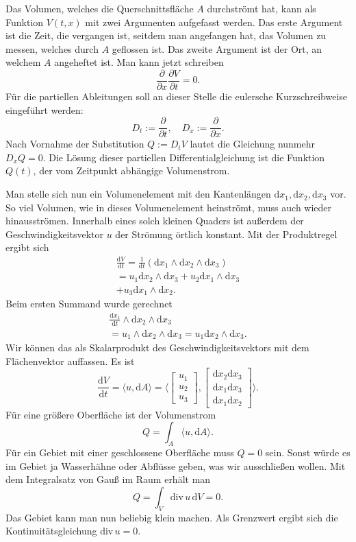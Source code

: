 \documentclass[a4paper,10pt,fleqn,twocolumn,twoside]{scrartcl}
\begin{document}
Das Volumen, welches die Querschnittsfläche $A$ durchströmt hat,
kann als Funktion $V(t,x)$ mit zwei Argumenten aufgefasst werden.
Das erste Argument ist die Zeit, die vergangen ist,
seitdem man angefangen hat, das Volumen zu messen, welches durch
$A$ geflossen ist. Das zweite Argument ist der Ort, an welchem
$A$ angeheftet ist. Man kann jetzt schreiben%
\[\frac{\partial}{\partial x}\frac{\partial V}{\partial t}=0.\]
Für die partiellen Ableitungen soll an dieser Stelle die eulersche
Kurzschreibweise eingeführt werden:%
\[D_t := \frac{\partial}{\partial t},\quad
D_x := \frac{\partial}{\partial x}.\]
Nach Vornahme der Substitution $Q:=D_tV$ lautet die
Gleichung nunmehr $D_x Q=0$. Die Lösung dieser partiellen
Differentialgleichung ist die Funktion $Q(t)$, der vom
Zeitpunkt abhängige Volumenstrom.

Man stelle sich nun ein Volumenelement mit den Kantenlängen
$\mathrm dx_1,\mathrm dx_2,\mathrm dx_3$ vor. So viel Volumen, wie
in dieses Volumenelement heinströmt, muss auch wieder hinausströmen.
Innerhalb eines solch kleinen Quaders ist außerdem der
Geschwindigkeitsvektor $u$ der Strömung örtlich konstant.
Mit der Produktregel ergibt sich%
\begin{gather*}\frac{\mathrm dV}{\mathrm dt}
= \frac{1}{\mathrm dt}
(\mathrm dx_1\wedge\mathrm dx_2\wedge\mathrm dx_3)\\
= u_1 \mathrm dx_2\wedge\mathrm dx_3 +
u_2\mathrm dx_1\wedge\mathrm dx_3\\
+ u_3\mathrm dx_1\wedge\mathrm dx_2.
\end{gather*}
Beim ersten Summand wurde gerechnet
\begin{gather*}
\frac{\mathrm dx_1}{\mathrm dt}\wedge
\mathrm dx_2\wedge\mathrm dx_3\\
= u_1\wedge\mathrm dx_2\wedge\mathrm dx_3
= u_1\mathrm dx_2\wedge\mathrm dx_3.
\end{gather*}
Wir können das als Skalarprodukt des Geschwindigkeitsvektors mit dem
Flächenvektor auffassen. Es ist%
\[\frac{\mathrm dV}{\mathrm dt} = \langle u,\mathrm dA\rangle
= \langle\begin{bmatrix} u_1\\u_2\\ u_3\end{bmatrix},
\begin{bmatrix}\mathrm dx_2\mathrm dx_3\\
\mathrm dx_1\mathrm dx_3\\
\mathrm dx_1\mathrm dx_2
\end{bmatrix}\rangle.\]
Für eine größere Oberfläche ist der Volumenstrom%
\[Q=\int_A \langle u,\mathrm dA\rangle.\]
Für ein Gebiet mit einer geschlossene Oberfläche muss $Q=0$ sein.
Sonst würde es im Gebiet ja Wasserhähne oder Abflüsse geben, was wir
ausschließen wollen. Mit dem Integralsatz von Gauß im Raum erhält man%
\[Q=\int_V \mathrm{div}\,u\,\mathrm dV=0.\]
Das Gebiet kann man nun beliebig klein machen. Als Grenzwert ergibt
sich die Kontinuitätsgleichung $\mathrm{div}\,u=0$.
\end{document}
